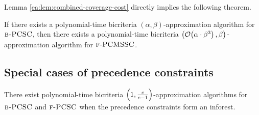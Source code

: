 Lemma \ref{ea:lem:combined-coverage-cost} directly implies the following theorem.
\begin{theorem}\label{ea:thm:BPCSC-to-PCMSSC}
    If there exists a polynomial-time bicriteria $(\alpha,\beta)$-approximation algorithm for $\textup{\textsc{b-PCSC}}$, then there exists a polynomial-time bicriteria $\mathopen{}\left( \mathcal{O}\mathopen{}\left( \alpha\cdot\beta^3 \right), \beta \right)$-approximation algorithm for $\textup{\textsc{f-PCMSSC}}$.
\end{theorem}

\subsection{Special cases of precedence constraints} \label{ea:subsection:SpecialCases}
\begin{theorem}\label{ea:thm:BPCSC-inforest}
    There exist polynomial-time bicriteria $\mathopen{}\left( 1, \frac{e}{e-1} \right)$-approximation algorithms for $\textup{\textsc{b-PCSC}}$ and $\textup{\textsc{f-PCSC}}$ when the precedence constraints form an inforest.
\end{theorem}

